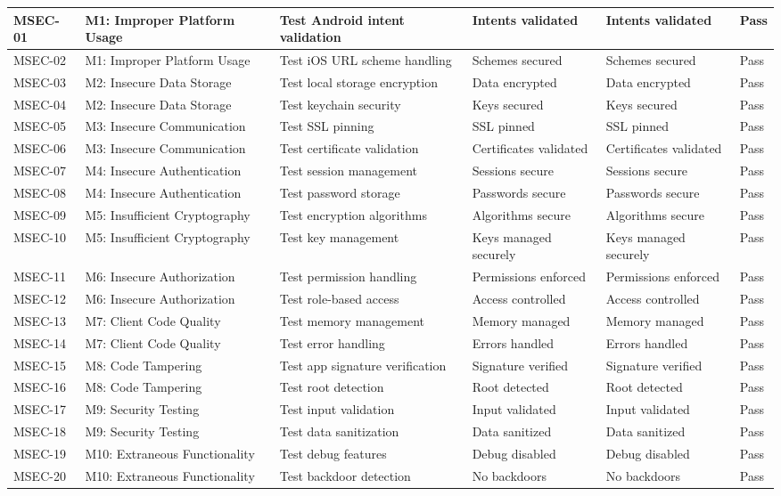 {\begin{longtable}{|C{1.5cm}|C{2.5cm}|C{3.5cm}|C{2.5cm}|C{2.5cm}|C{1.5cm}|}
MSEC-01 & M1: Improper Platform Usage & Test Android intent validation & Intents validated & Intents validated & Pass \\
\hline
MSEC-02 & M1: Improper Platform Usage & Test iOS URL scheme handling & Schemes secured & Schemes secured & Pass \\
\hline
MSEC-03 & M2: Insecure Data Storage & Test local storage encryption & Data encrypted & Data encrypted & Pass \\
\hline
MSEC-04 & M2: Insecure Data Storage & Test keychain security & Keys secured & Keys secured & Pass \\
\hline
MSEC-05 & M3: Insecure Communication & Test SSL pinning & SSL pinned & SSL pinned & Pass \\
\hline
MSEC-06 & M3: Insecure Communication & Test certificate validation & Certificates validated & Certificates validated & Pass \\
\hline
MSEC-07 & M4: Insecure Authentication & Test session management & Sessions secure & Sessions secure & Pass \\
\hline
MSEC-08 & M4: Insecure Authentication & Test password storage & Passwords secure & Passwords secure & Pass \\
\hline
MSEC-09 & M5: Insufficient Cryptography & Test encryption algorithms & Algorithms secure & Algorithms secure & Pass \\
\hline
MSEC-10 & M5: Insufficient Cryptography & Test key management & Keys managed securely & Keys managed securely & Pass \\
\hline
MSEC-11 & M6: Insecure Authorization & Test permission handling & Permissions enforced & Permissions enforced & Pass \\
\hline
MSEC-12 & M6: Insecure Authorization & Test role-based access & Access controlled & Access controlled & Pass \\
\hline
MSEC-13 & M7: Client Code Quality & Test memory management & Memory managed & Memory managed & Pass \\
\hline
MSEC-14 & M7: Client Code Quality & Test error handling & Errors handled & Errors handled & Pass \\
\hline
MSEC-15 & M8: Code Tampering & Test app signature verification & Signature verified & Signature verified & Pass \\
\hline
MSEC-16 & M8: Code Tampering & Test root detection & Root detected & Root detected & Pass \\
\hline
MSEC-17 & M9: Security Testing & Test input validation & Input validated & Input validated & Pass \\
\hline
MSEC-18 & M9: Security Testing & Test data sanitization & Data sanitized & Data sanitized & Pass \\
\hline
MSEC-19 & M10: Extraneous Functionality & Test debug features & Debug disabled & Debug disabled & Pass \\
\hline
MSEC-20 & M10: Extraneous Functionality & Test backdoor detection & No backdoors & No backdoors & Pass \\
\hline
\end{longtable}
}

